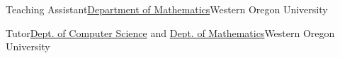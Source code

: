 
		{Teaching Assistant}{\href{http://www.wou.edu/las/natsci_math/math/}{Department of Mathematics}}{Western Oregon University}{}{}

		{Tutor}{\href{http://www.wou.edu/las/cs/index.php}{Dept. of Computer Science} and \href{http://www.wou.edu/las/natsci_math/math/}{Dept. of Mathematics}}{Western Oregon University}{}{}

